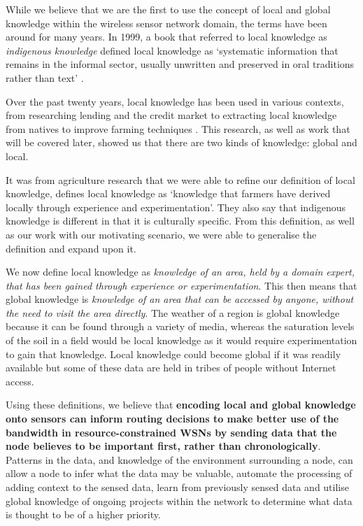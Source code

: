While we believe that we are the first to use the concept of local and global knowledge within the wireless sensor network domain, the terms have been around for many years. In 1999, a book that referred to local knowledge as \textit{indigenous knowledge} defined local knowledge as ‘systematic information that remains in the informal sector, usually unwritten and preserved in oral traditions rather than text’ \cite{LadislausM.Semali}. 

Over the past twenty years, local knowledge has been used in various contexts, from researching lending and the credit market \cite{Stiglitz1990} to extracting local knowledge from natives to improve farming techniques \cite{DEWALT}. This research, as well as work that will be covered later, showed us that there are two kinds of knowledge: global and local. 

It was from agriculture research that we were able to refine our definition of local knowledge, \cite{Joshi2001} defines local knowledge as ‘knowledge that farmers have derived locally through experience and experimentation’. They also say that indigenous knowledge is different in that it is culturally specific. From this definition, as well as our work with our motivating scenario, we were able to generalise the definition and expand upon it.

We now define local knowledge as \textit{knowledge of an area, held by a domain expert, that has been gained through experience or experimentation}. This then means that global knowledge is \textit{knowledge of an area that can be accessed by anyone, without the need to visit the area directly}. The weather of a region is global knowledge because it can be found through a variety of media, whereas the saturation levels of the soil in a field would be local knowledge as it would require experimentation to gain that knowledge. Local knowledge could become global if it was readily available but some of these data are held in tribes of people without Internet access.

Using these definitions, we believe that \textbf{encoding local and global knowledge onto sensors can inform routing decisions to make better use of the bandwidth in resource-constrained WSNs by sending data that the node believes to be important first, rather than chronologically}. Patterns in the data, and knowledge of the environment surrounding a node, can allow a node to infer what the data may be valuable, automate the processing of adding context to the sensed data, learn from previously sensed data and utilise global knowledge of ongoing projects within the network to determine what data is thought to be of a higher priority.

